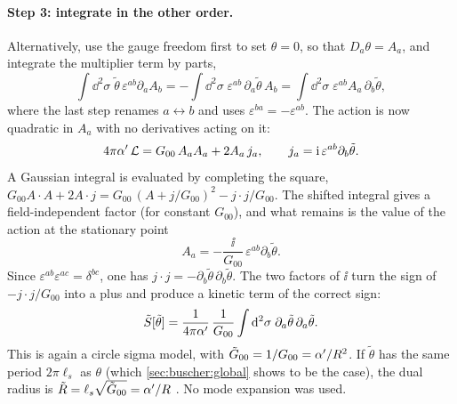 \paragraph{Step 3: integrate in the other order.} Alternatively, use the gauge freedom first to
set $\theta=0$, so that $D_a\theta=A_a$, and integrate the multiplier term by parts,
\begin{equation}\label{eq:buscher:byparts}
 \int\dd^2\sigma\;\tilde\theta\,\varepsilon^{ab}\partial_aA_b
 =-\int\dd^2\sigma\;\varepsilon^{ab}\,\partial_a\tilde\theta\,A_b
 =\int\dd^2\sigma\;\varepsilon^{ab}A_a\,\partial_b\tilde\theta ,
\end{equation}
where the last step renames $a\leftrightarrow b$ and uses
$\varepsilon^{ba}=-\varepsilon^{ab}$. The action is now quadratic in $A_a$ with no
derivatives acting on it:
\begin{equation}\label{eq:buscher:quadratic1}
 4\pi\alpha'\,\mathcal L=G_{00}\,A_aA_a+2A_a\,j_a,\qquad
 j_a=\mathrm{i}\,\varepsilon^{ab}\partial_b\tilde\theta .
\end{equation}
A Gaussian integral is evaluated by completing the square,
$G_{00}A\cdot A+2A\cdot j=G_{00}\,(A+j/G_{00})^2-j\cdot j/G_{00}$. The shifted integral gives
a field-independent factor (for constant $G_{00}$), and what remains is the value of the
action at the stationary point
\begin{equation}\label{eq:buscher:dualrel1}
 A_a=-\frac{\ii}{G_{00}}\,\varepsilon^{ab}\partial_b\tilde\theta .
\end{equation}
Since $\varepsilon^{ab}\varepsilon^{ac}=\delta^{bc}$, one has
$j\cdot j=-\partial_b\tilde\theta\,\partial_b\tilde\theta$. The two factors of $\ii$ turn
the sign of $-j\cdot j/G_{00}$ into a plus and produce a kinetic term of the correct sign:
\begin{equation}\label{eq:buscher:dualcircle}
 \tilde S[\tilde\theta]=\frac{1}{4\pi\alpha'}\,\frac{1}{G_{00}}\int\mathrm{d}^2\sigma\;
   \partial_a\tilde\theta\,\partial_a\tilde\theta .
\end{equation}
This is again a circle sigma model, with $\tilde G_{00}=1/G_{00}=\alpha'/R^2$. If $\tilde\theta$
has the same period $2\pi\ell_s$ as $\theta$ (which \cref{sec:buscher:global} shows to be the
case), the dual radius is $\tilde R=\ell_s\sqrt{\tilde G_{00}}=\alpha'/R$
. No mode expansion was used.

